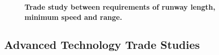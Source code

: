 \documentclass[]{aiaa-tc}%
\begin{document}
\begin{figure}[h!]
 \begin{subfigmatrix}{2}%
 \end{subfigmatrix}
 \caption{\textbf{Trade study between requirements of runway length, minimum speed and range.}}
 \label{f:minspeed}
\end{figure}

\subsection{Advanced Technology Trade Studies}
\end{document}
